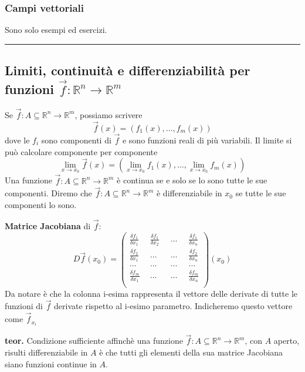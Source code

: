 \subsubsection*{Campi vettoriali}
Sono solo esempi ed esercizi.\newline
\rule{\textwidth}{2pt}
\subsection*{Limiti, continuità e differenziabilità per funzioni $\vec{f}:\mathbb{R}^n \rightarrow \mathbb{R}^m$}
Se $\vec{f} : A \subseteq \mathbb{R}^n \rightarrow  \mathbb{R}^m$, possiamo scrivere
\[
    \vec{f}(x) = (f_1(x), \dots,f_m(x))
\]
dove le $f_i$ sono componenti di $\vec{f}$ e sono funzioni reali di più variabili.\newline
\newline
Il limite si può calcolare componente per componente
\[
    \lim_{x\rightarrow x_0} \vec{f}(x) = (\lim_{x\rightarrow x_0}f_1(x), \dots,\lim_{x\rightarrow x_0}f_m(x))
\]
\newline
Una funzione $\vec{f} : A \subseteq \mathbb{R}^n \rightarrow  \mathbb{R}^m$ è continua se e solo se lo sono tutte le sue componenti.\newline
\newline
Diremo che $\vec{f} : A \subseteq \mathbb{R}^n \rightarrow  \mathbb{R}^m$ è differenziabile in $x_0$ se tutte le sue componenti lo sono.\newline
\newline
\begin{tcolorbox}
\textbf{Matrice Jacobiana} di $\vec{f}$:
\[
    D \vec{f}(x_0) = \left(\begin{matrix}
        \frac{\delta f_1}{\delta x_1} \;\; & \frac{\delta f_1}{\delta x_2} \;\; & \dots \;\; & \frac{\delta f_1}{\delta x_n}\\
        \frac{\delta f_2}{\delta x_1} & \dots & \dots & \frac{\delta f_2}{\delta x_n}\\
        \dots &\dots&\dots&\dots\\
        \frac{\delta f_m}{\delta x_1} & \dots & \dots & \frac{\delta f_m}{\delta x_n}\\
    \end{matrix}\right) (x_0)
\]
Da notare è che la colonna i-esima rappresenta il vettore delle derivate di tutte le funzioni di $\vec{f}$ derivate rispetto al i-esimo parametro. Indicheremo questo vettore come $\vec{f}_{x_i}$ 
\end{tcolorbox}
\textbf{teor.} Condizione sufficiente affinchè una funzione $\vec{f}: A \subseteq \mathbb{R}^n \rightarrow \mathbb{R}^m$, con $A$ aperto, risulti differenziabile in $A$ è che tutti gli elementi della sua matrice Jacobiana siano funzioni continue in $A$.\newline
